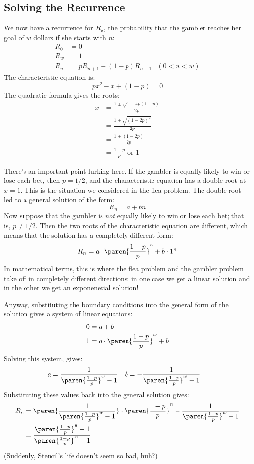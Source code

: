 \subsection{Solving the Recurrence}

We now have a recurrence for $R_n$, the probability that the gambler
reaches her goal of $w$ dollars if she starts with $n$:
%
\begin{align*}
R_0 & = 0 \\
R_w & = 1 \\
R_n & = p R_{n+1} + (1 - p) R_{n-1} & (0 < n < w)
\end{align*}
%
The characteristic equation is:
%
\[
p x^2 - x + (1-p) = 0
\]
%
The quadratic formula gives the roots:
%
\begin{align*}
x & = \frac{1 \pm \sqrt{1 - 4 p (1-p)}}{2p} \\
  & = \frac{1 \pm \sqrt{(1-2p)^2}}{2p} \\
  & = \frac{1 \pm (1-2p)}{2p} \\
  & = \frac{1-p}{p} \text{ or } 1
\end{align*}

There's an important point lurking here.  If the gambler is equally
likely to win or lose each bet, then $p = 1/2$, and the characteristic
equation has a double root at $x = 1$.  This is the situation we
considered in the flea problem.  The double root led to a general
solution of the form:
%
\[
R_n = a + b n
\]
%
Now suppose that the gambler is \textit{not} equally likely to win or
lose each bet; that is, $p \neq 1/2$.  Then the two roots of the
characteristic equation are different, which means that the solution
has a completely different form:
%
\[
R_n = a \cdot \paren{\frac{1-p}{p}}^n + b \cdot 1^n
\]
%
In mathematical terms, this is where the flea problem and the gambler
problem take off in completely different directions: in one case we
get a linear solution and in the other we get an exponenetial
solution!

Anyway, substituting the boundary conditions into the general form of
the solution gives a system of linear equations:
%
\begin{align*}
0 & = a + b \\
1 & = a \cdot \paren{\frac{1-p}{p}}^w + b
\end{align*}
%
Solving this system, gives:
%
\begin{align*}
a & = \frac{1}{\paren{\frac{1-p}{p}}^w-1} &
b & = - \frac{1}{\paren{\frac{1-p}{p}}^w-1} &
\end{align*}
%
Substituting these values back into the general solution gives:
%
\begin{align*}
R_n
    & = \paren{\frac{1}{\paren{\frac{1-p}{p}}^w-1}} \cdot
        \paren{\frac{1-p}{p}}^n - \frac{1}{\paren{\frac{1-p}{p}}^w-1} \\
    & = \frac{\paren{\frac{1-p}{p}}^n-1}{\paren{\frac{1-p}{p}}^w-1}
\end{align*}
%
(Suddenly, Stencil's life doesn't seem so bad, huh?)

